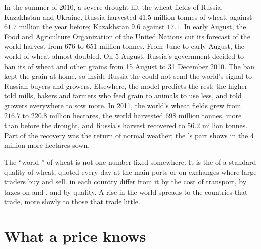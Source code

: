\begin{record}[The 2010 wheat harvest]
In the summer of 2010, a severe drought hit the wheat fields of Russia,
Kazakhstan and Ukraine. Russia harvested $41.5$ million tonnes of wheat, against $61.7$
million the year before; Kazakhstan $9.6$ against $17.1$. In early August, the Food and Agriculture
Organization of the United Nations cut its forecast of the world harvest from 676 to 651 million tonnes. From June to
early August, the world  of wheat almost doubled. On 5 August, Russia's government
decided to ban its  of wheat and other grains from 15 August to 31 December 2010.
The ban kept the grain at home, so inside Russia the  could not send the world's
signal to Russian buyers and growers. Elsewhere, the model predicts the rest: the higher
 told mills, bakers and farmers who feed grain to animals to use less, and told growers
everywhere to sow more. In 2011, the world's wheat fields grew from $216.7$ to $220.8$ million
hectares, the world harvested 698 million tonnes, more than before the drought, and Russia's
harvest recovered to $56.2$ million tonnes. Part of the recovery was the return of normal
weather; the 's part shows in the 4 million more hectares sown.
\end{record}

\begin{measure}
The ``world '' of wheat is not one number fixed somewhere. It is the  of a
standard quality of wheat, quoted every day at the main ports or on exchanges where large
traders buy and sell.  in each country differ from it by the cost of transport, by
taxes on  and , and by quality. A rise in the world  spreads to the
countries that trade, more slowly to those that trade little.
\end{measure}

\section{What a price knows}

